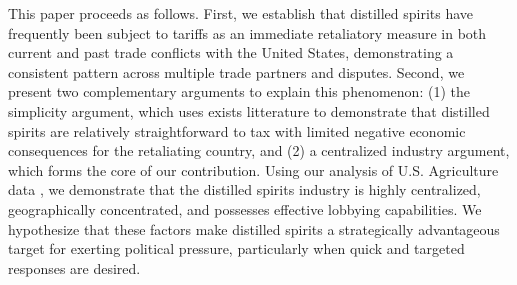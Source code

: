 \documentclass[AEJ]{AEA}
\begin{document}
	This paper proceeds as follows. First, we establish that distilled spirits have frequently been subject to tariffs as an immediate retaliatory measure in both current and past trade conflicts with the United States, demonstrating a consistent pattern across multiple trade partners and disputes. Second, we present two complementary arguments to explain this phenomenon: (1) the simplicity argument, which uses exists litterature to demonstrate that distilled spirits are relatively straightforward to tax with limited negative economic consequences for the retaliating country, and (2) a centralized industry argument, which forms the core of our contribution. Using our analysis of U.S. Agriculture data , we demonstrate that the distilled spirits industry is highly centralized, geographically concentrated, and possesses effective lobbying capabilities. We hypothesize that these factors make distilled spirits a strategically advantageous target for exerting political pressure, particularly when quick and targeted responses are desired.
	
	
	
	
	
\end{document}
